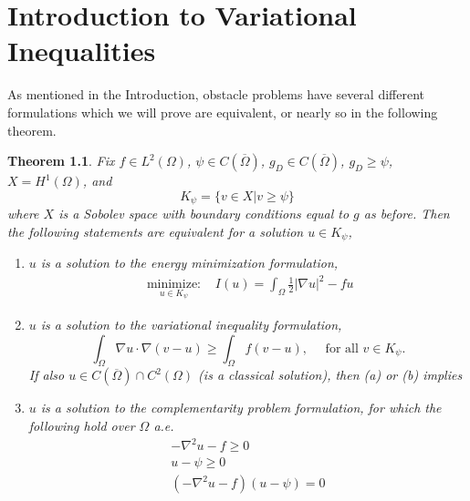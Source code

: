 \documentclass[12 pt]{report}
\newtheorem{theo}{Theorem}
\newenvironment{ftheo}[1][]
  {\begin{mdframed}\begin{theo}\ifthenelse{\equal{#1}{}}{}{\ (#1)}}
  {\end{theo}\end{mdframed}}
\newcommand{\abs}[1]{\left| #1 \right|}
\begin{document}
\chapter{Introduction to Variational Inequalities}
As mentioned in the Introduction, obstacle problems have several different formulations which we will prove are equivalent, or nearly so in the following theorem. 
\begin{ftheo} Fix $f \in L^2(\Omega)$, $\psi \in C(\overline{\Omega})$, $g_D \in C(\overline{\Omega})$, $g_D \geq \psi$, $X = H^1(\Omega)$, and
  \begin{equation}
    K_\psi = \{v \in X| v \geq \psi\}
  \end{equation}
   where $X$ is a Sobolev space with boundary conditions equal to $g$ as before. Then the following statements are equivalent for a solution $u \in K_\psi$, 
  \begin{enumerate}
    \item[(a)] $u$ is a solution to the energy minimization formulation, 
\begin{align}
    \underset{u \in K_\psi}{\text{ minimize: }}  &I(u) = \int_\Omega \frac{1}{2} \abs{\nabla u}^2 - fu 
  \end{align}
    \item[(b)] $u$ is a solution to the variational inequality formulation,
      \begin{equation}
    \int_\Omega \nabla u \cdot \nabla(v - u) \geq \int_\Omega f(v - u), \quad \text{ for all } v \in K_\psi.
  \end{equation} 
If also $u \in C(\overline{\Omega}) \cap C^2(\Omega)$ (is a classical solution), then (a) or (b) implies
    \item[(c)] $u$ is a solution to the complementarity problem formulation, for which the following hold over $\Omega$ a.e.
    \begin{subequations}
      \label{ncp}
      \begin{align}
        -\nabla^2 u - f \geq 0\label{ncp:1}\\
        u - \psi \geq 0\label{ncp:1}\\
        (-\nabla^2u - f)(u - \psi) = 0\label{ncp:1}
      \end{align}
    \end{subequations}
  \end{enumerate}
\end{ftheo}
\end{document}
